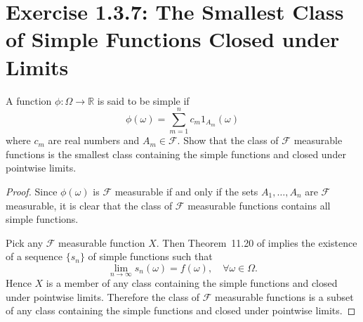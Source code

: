 \documentclass{amsbook}
\theoremstyle{definition}
\theoremstyle{remark}
\numberwithin{section}{chapter}
\numberwithin{equation}{chapter}
\begin{document}
\section{Exercise 1.3.7: The Smallest Class of Simple Functions Closed under Limits}
A function $\phi:\Omega\to\mathbb{R}$ is said to be simple if\[
\phi(\omega)=\sum_{m=1}^nc_m1_{A_m}(\omega)
\]where $c_m$ are real numbers and $A_m\in\mathcal{F}$. Show that the class of $\mathcal{F}$ measurable functions is the smallest class containing the simple functions and closed under pointwise limits.
\begin{proof}
Since $\phi(\omega)$ is $\mathcal{F}$ measurable if and only if the sets $A_1,\dots,A_n$ are $\mathcal{F}$ measurable, it is clear that the class of $\mathcal{F}$ measurable functions contains all simple functions.

Pick any $\mathcal{F}$ measurable function $X$. Then Theorem~11.20 of \cite{rudin1976principles} implies the existence of a sequence $\{s_n\}$ of simple functions such that\[
\lim_{n\to\infty}s_n(\omega)=f(\omega),\quad\forall\omega\in\Omega.
\]Hence $X$ is a member of any class containing the simple functions and closed under pointwise limits. Therefore the class of $\mathcal{F}$ measurable functions is a subset of any class containing the simple functions and closed under pointwise limits.
\end{proof}


\backmatter


\end{document}

